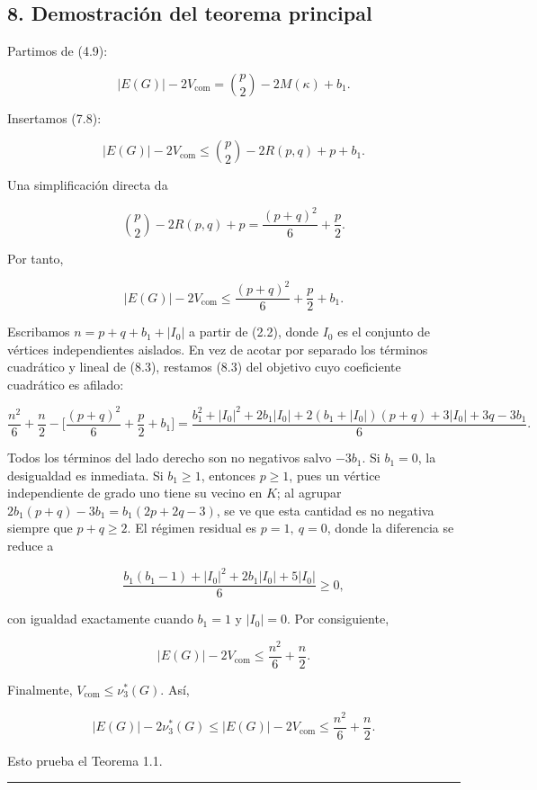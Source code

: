 \documentclass[
  spanish,
  11pt,
  a4paper,
]{article}
\begin{document}
\subsection{8. Demostración del teorema principal}\label{demostraciuxf3n-del-teorema-principal}

Partimos de (4.9):

\[
|E(G)|-2V_{\mathrm{com}}
=
\binom p2-2M(\kappa)+b_1.
\]

Insertamos (7.8):

\[
|E(G)|-2V_{\mathrm{com}}
\le
\binom p2-2R(p,q)+p+b_1.
\tag{8.1}
\]

Una simplificación directa da

\[
\binom p2-2R(p,q)+p
=
\frac{(p+q)^2}{6}+\frac p2.
\tag{8.2}
\]

Por tanto,

\[
|E(G)|-2V_{\mathrm{com}}
\le
\frac{(p+q)^2}{6}+\frac p2+b_1.
\tag{8.3}
\]

Escribamos \(n=p+q+b_1+|I_0|\) a partir de (2.2), donde \(I_0\) es el conjunto de vértices independientes aislados. En vez de acotar por separado los términos cuadrático y lineal de (8.3), restamos (8.3) del objetivo cuyo coeficiente cuadrático es afilado:

\[
\frac{n^2}{6}+\frac n2-\Big[\frac{(p+q)^2}{6}+\frac p2+b_1\Big]
=
\frac{b_1^2+|I_0|^2+2b_1|I_0|+2(b_1+|I_0|)(p+q)+3|I_0|+3q-3b_1}{6}.
\]

Todos los términos del lado derecho son no negativos salvo \(-3b_1\). Si \(b_1=0\), la desigualdad es inmediata. Si \(b_1\ge1\), entonces \(p\ge1\), pues un vértice independiente de grado uno tiene su vecino en \(K\); al agrupar \(2b_1(p+q)-3b_1=b_1(2p+2q-3)\), se ve que esta cantidad es no negativa siempre que \(p+q\ge2\). El régimen residual es \(p=1,\ q=0\), donde la diferencia se reduce a

\[
\frac{b_1(b_1-1)+|I_0|^2+2b_1|I_0|+5|I_0|}{6}\ge0,
\]

con igualdad exactamente cuando \(b_1=1\) y \(|I_0|=0\). Por consiguiente,

\[
|E(G)|-2V_{\mathrm{com}}
\le
\frac{n^2}{6}+\frac n2.
\tag{8.4}
\]

Finalmente, \(V_{\mathrm{com}}\le\nu_3^*(G)\). Así,

\[
|E(G)|-2\nu_3^*(G)
\le
|E(G)|-2V_{\mathrm{com}}
\le
\frac{n^2}{6}+\frac n2.
\]

Esto prueba el Teorema 1.1.

\begin{center}\rule{0.5\linewidth}{0.5pt}\end{center}
\end{document}
